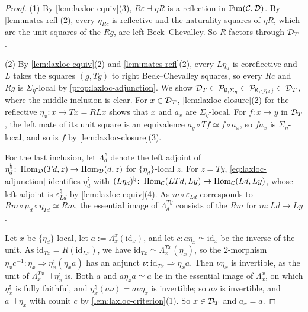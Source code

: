 \begin{proof}
%
(1) By \cref{lem:laxloc-equiv}(3),
$R\varepsilon \dashv \eta R$
is a reflection in $\operatorname{Fun}(\mathcal{C},\mathcal{D})$. By \cref{lem:mates-refl}(2), every
$\eta_{Rc}$ is reflective and the naturality squares of $\eta R$, which are the
unit squares of the $Rg$, are left Beck--Chevalley. So $R$ factors through
$\mathcal{D}_{T}$ \cite[Cor.~2.6.6]{abellangagnahaugseng2024straightening}.

(2) By \cref{lem:laxloc-equiv}(2) and \cref{lem:mates-refl}(2), every
$L\eta_{d}$ is coreflective and $L$ takes the squares $(g,Tg)$ to right
Beck--Chevalley squares, so every $Rc$ and $Rg$ is $\Sigma_{\eta}$-local by
\cref{prop:laxloc-adjunction}. We show
$\mathcal{D}_{T} \subset \mathcal{P}_{\emptyset,\Sigma_{\eta}} \subset
\mathcal{P}_{\emptyset,\{\eta_{d}\}} \subset \mathcal{D}_{T}$,
where the middle inclusion is clear. For $x \in \mathcal{D}_{T}$,
\cref{lem:laxloc-closure}(2)
for the reflective
$\eta_{x}\colon x \to Tx = RLx$
shows that $x$ and $a_{x}$ are $\Sigma_{\eta}$-local. For
$f\colon x \to y$
in $\mathcal{D}_{T}$, the left mate of its unit square is an equivalence
$a_{y} \circ Tf \simeq f \circ a_{x}$,
so $fa_{x}$ is $\Sigma_{\eta}$-local, and so is $f$ by
\cref{lem:laxloc-closure}(3).

For the last inclusion, let $\Lambda^{z}_{d}$ denote the left adjoint of
$\eta_{d}^{\natural}\colon \operatorname{Hom}_{\mathcal{D}}(Td,z) \to \operatorname{Hom}_{\mathcal{D}}(d,z)$
for $\{\eta_{d}\}$-local $z$. For $z = Ty$, \eqref{eq:laxloc-adjunction}
identifies $\eta_{d}^{\natural}$ with
$(L\eta_{d})^{\natural}\colon \operatorname{Hom}_{\mathcal{C}}(LTd,Ly) \to \operatorname{Hom}_{\mathcal{C}}(Ld,Ly)$,
whose left adjoint is
$\varepsilon_{Ld}^{\natural}$
by
\cref{lem:laxloc-equiv}(4). As
$m \circ \varepsilon_{Ld}$
corresponds to
$Rm \circ \mu_{d} \circ \eta_{Td} \simeq Rm$,
the essential image of $\Lambda^{Ty}_{d}$ consists of the $Rm$ for
$m\colon Ld \to Ly$.

Let $x$ be $\{\eta_{d}\}$-local, let
$a := \Lambda^{x}_{x}(\mathrm{id}_{x})$,
and let
$c\colon a\eta_{x} \simeq \mathrm{id}_{x}$
be the inverse of the unit. As
$\mathrm{id}_{Tx} = R(\mathrm{id}_{Lx})$,
we have
$\mathrm{id}_{Tx} \simeq \Lambda^{Tx}_{x}(\eta_{x})$,
so the $2$-morphism
$\eta_{x}c^{-1}\colon \eta_{x} \Rightarrow \eta_{x}^{\natural}(\eta_{x}a)$
has an adjunct
$\nu\colon \mathrm{id}_{Tx} \Rightarrow \eta_{x}a$.
Then $\nu\eta_{x}$ is invertible, as the unit of
$\Lambda^{Tx}_{x} \dashv \eta_{x}^{\natural}$
is. Both $a$ and
$a\eta_{x}a \simeq a$
lie in the essential image of $\Lambda^{x}_{x}$, on which $\eta_{x}^{\natural}$
is fully faithful, and
$\eta_{x}^{\natural}(a\nu) = a\nu\eta_{x}$
is invertible; so $a\nu$ is invertible, and
$a \dashv \eta_{x}$
with counit $c$ by \cref{lem:laxloc-criterion}(1). So $x \in \mathcal{D}_{T}$ and
$a_{x} = a$.


\end{proof}

